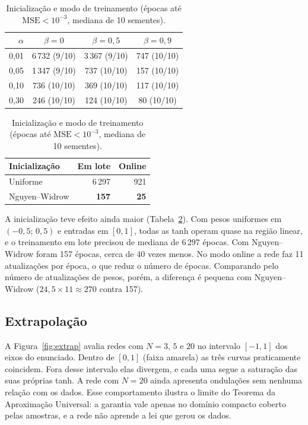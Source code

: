 \documentclass[12pt,oneside,a4paper,english,brazil]{abntex2}
\newcommand{\mse}{\mathrm{MSE}}
\begin{document}
\begin{table}[H]
\centering
\begin{minipage}[t]{0.56\textwidth}\centering
\caption{Épocas até $\mse<10^{-3}$ (mediana de 10 sementes; entre parênteses, quantas convergiram).}
\label{tab:lr}
\small
\begin{tabular}{rccc}
\toprule
$\alpha$ & $\beta=0$ & $\beta=0{,}5$ & $\beta=0{,}9$\\
\midrule
0,01 & 6\,732 (9/10) & 3\,367 (9/10) & 747 (10/10)\\
0,05 & 1\,347 (9/10) & 737 (10/10) & 157 (10/10)\\
0,10 & 736 (10/10) & 369 (10/10) & 117 (10/10)\\
0,30 & 246 (10/10) & 124 (10/10) & 80 (10/10)\\
\bottomrule
\end{tabular}
\end{minipage}\hfill
\begin{minipage}[t]{0.40\textwidth}\centering
\caption{Inicialização e modo de treinamento (épocas até $\mse<10^{-3}$, mediana de 10 sementes).}
\label{tab:init}
\small\setlength{\tabcolsep}{4pt}
\begin{tabular}{lrr}
\toprule
Inicialização & Em lote & Online\\
\midrule
Uniforme & 6\,297 & 921\\
Nguyen--Widrow & \textbf{157} & \textbf{25}\\
\bottomrule
\end{tabular}
\end{minipage}
\end{table}

A inicialização teve efeito ainda maior (Tabela~\ref{tab:init}). Com pesos
uniformes em $(-0{,}5;\,0{,}5)$ e entradas em $[0,1]$, todas as tanh operam
quase na região linear, e o treinamento em lote precisou de mediana de 6\,297
épocas. Com Nguyen--Widrow foram 157 épocas, cerca de 40 vezes menos. No modo
online a rede faz 11 atualizações por época, o que reduz o número de épocas.
Comparando pelo número de atualizações de pesos, porém, a diferença é pequena
com Nguyen--Widrow ($24{,}5\times11\approx270$ contra 157).



\subsection{Extrapolação}
A Figura~\ref{fig:extrap} avalia redes com $N=3$, $5$ e $20$ no intervalo
$[-1,1]$ dos eixos do enunciado. Dentro de $[0,1]$ (faixa amarela) as três
curvas praticamente coincidem. Fora desse intervalo elas divergem, e cada uma
segue a saturação das suas próprias tanh. A rede com $N=20$ ainda apresenta
ondulações sem nenhuma relação com os dados. Esse comportamento ilustra o
limite do Teorema da Aproximação Universal: a garantia vale apenas no domínio
compacto coberto pelas amostras, e a rede não aprende a lei que gerou os
dados.
\end{document}
